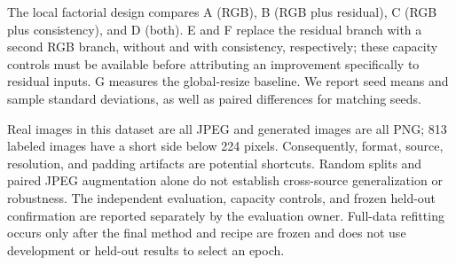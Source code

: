 The local factorial design compares A (RGB), B (RGB plus residual), C (RGB plus
consistency), and D (both). E and F replace the residual branch with a second
RGB branch, without and with consistency, respectively; these capacity controls
must be available before attributing an improvement specifically to residual
inputs. G measures the global-resize baseline. We report seed means and sample
standard deviations, as well as paired differences for matching seeds.

Real images in this dataset are all JPEG and generated images are all PNG;
813 labeled images have a short side below 224 pixels. Consequently, format,
source, resolution, and padding artifacts are potential shortcuts. Random
splits and paired JPEG augmentation alone do not establish cross-source
generalization or robustness. The independent evaluation, capacity controls,
and frozen held-out confirmation are reported separately by the evaluation
owner. Full-data refitting occurs only after the final method and recipe are
frozen and does not use development or held-out results to select an epoch.
